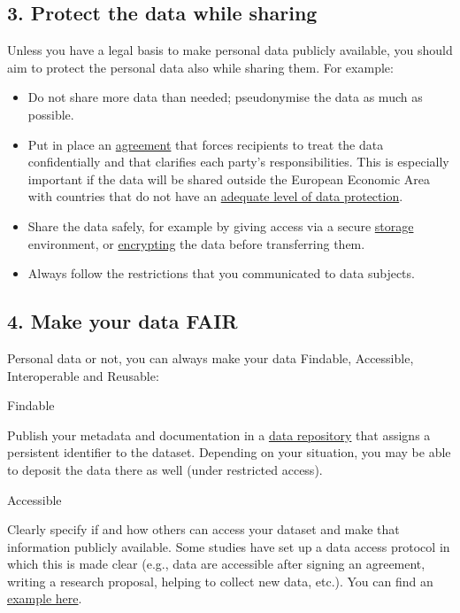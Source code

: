 \documentclass[
]{book}
\providecommand{\tightlist}{%
  \setlength{\itemsep}{0pt}\setlength{\parskip}{0pt}}
\begin{document}
\hypertarget{protect-sharing-reuse}{%
\subsection{3. Protect the data while sharing}\label{protect-sharing-reuse}}

Unless you have a legal basis to make personal data publicly available, you
should aim to protect the personal data also while sharing them. For example:

\begin{itemize}
\tightlist
\item
  Do not share more data than needed; pseudonymise the data as much as possible.
\item
  Put in place an \protect\hyperlink{agreements}{agreement} that forces recipients to treat the
  data confidentially and that clarifies each party's responsibilities. This is
  especially important if the data will be shared outside the European Economic Area
  with countries that do not have an
  \href{https://ec.europa.eu/info/law/law-topic/data-protection/international-dimension-data-protection/adequacy-decisions_en}{adequate level of data protection}.
\item
  Share the data safely, for example by giving access via a secure
  \protect\hyperlink{data-storage}{storage} environment, or \protect\hyperlink{encryption}{encrypting} the data
  before transferring them.
\item
  Always follow the restrictions that you communicated to data subjects.
\end{itemize}

\hypertarget{fair-personal-data}{%
\subsection{4. Make your data FAIR}\label{fair-personal-data}}

Personal data or not, you can always make your data Findable, Accessible,
Interoperable and Reusable:

Findable

Publish your metadata and documentation in a
\href{https://tools.uu.nl/repository-decision-tool/}{data repository}
that assigns a persistent identifier to the dataset. Depending on your
situation, you may be able to deposit the data there as well (under restricted
access).

Accessible

Clearly specify if and how others can access your dataset and make that
information publicly available. Some studies have set up a data access
protocol in which this is made clear (e.g., data are accessible after signing
an agreement, writing a research proposal, helping to collect new data, etc.).
You can find an
\href{https://www.uu.nl/sites/default/files/DataAccessProtocol_YOUth_220627.pdf}{example here}.
\end{document}

